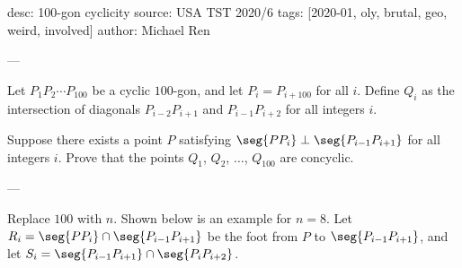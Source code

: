 desc: 100-gon cyclicity
source: USA TST 2020/6
tags: [2020-01, oly, brutal, geo, weird, involved]
author: Michael Ren

---

Let $P_1P_2\cdots P_{100}$ be a cyclic $100$-gon, and let $P_i=P_{i+100}$ for all $i$. Define $Q_i$ as the intersection of diagonals $P_{i-2}P_{i+1}$ and $P_{i-1}P_{i+2}$ for all integers $i$.

Suppose there exists a point $P$ satisfying $\seg{PP_i}\perp\seg{P_{i-1}P_{i+1}}$ for all integers $i$. Prove that the points $Q_1$, $Q_2$, $\ldots$, $Q_{100}$ are concyclic.

---

Replace $100$ with $n$. Shown below is an example for $n=8$. Let $R_i=\seg{PP_i}\cap\seg{P_{i-1}P_{i+1}}$ be the foot from $P$ to $\seg{P_{i-1}P_{i+1}}$, and let $S_i=\seg{P_{i-1}P_{i+1}}\cap\seg{P_iP_{i+2}}$.

